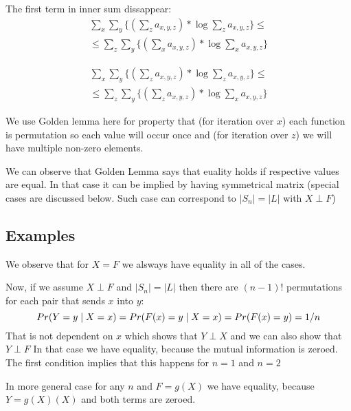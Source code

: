 The first term in inner sum dissappear:
\begin{gather*}
\sum_{x}{\sum_{y}{\{ (\sum_{z}{a_{x,y,z}}) * \log{\sum_{z}{a_{x,y,z}}} \}}} \leq \\
\leq \sum_{z}{\sum_{y}{\{ (\sum_{x}{a_{x,y,z}}) * \log{\sum_{x}{a_{x,y,z}}} \}}} 
\end{gather*}

\begin{gather*}
\sum_{x}{\sum_{y}{\{ (\sum_{z}{a_{x,y,z}}) * \log{\sum_{z}{a_{x,y,z}}} \}}} \leq \\
\leq \sum_{z}{\sum_{y}{\{ (\sum_{z}{a_{x,y,z}}) * \log{\sum_{x}{a_{x,y,z}}} \}}} 
\end{gather*}

We use Golden lemma here for property that (for iteration over $x$) each function is permutation so each value will occur once and
(for iteration over $z$) we will have multiple non-zero elements.

We can observe that Golden Lemma says that euality holds if respective values are equal. In that case it can be implied by having symmetrical matrix
(special cases are discussed below. Such case can correspond to $|S_n|=|L|$ with $X \perp F$)


\subsection{Examples}

We observe that for $X=F$ we alsways have equality in all of the cases.

Now, if we assume $X \perp F$ and $|S_n|=|L|$ then there are $(n-1)!$ permutations for each pair that sends $x$ into $y$:
\begin{equation}
\prob{Y=y}[X=x]=\prob{F(x)=y}[X=x]=\prob{F(x)=y}=1/n
\end{equation}
That is not dependent on $x$ which shows that $Y \perp X$ and we can also show that $Y \perp F$
In that case we have equality, because the mutual information is zeroed.
The first condition implies that this happens for $n=1$ and $n=2$

In more general case for any $n$ and $F=g(X)$ we have equality, because $Y=g(X)(X)$ and both terms are zeroed.



